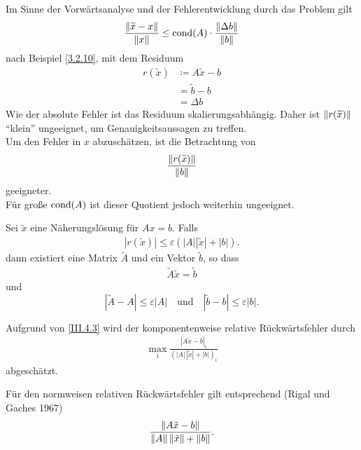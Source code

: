 Im Sinne der Vorwärtsanalyse und der Fehlerentwicklung durch das Problem gilt
\begin{gather*}
  \frac{\nn[\widetilde{x}-x]}{\nn[x]} 
  \leq \Cond(A) \cdot \frac{\nn[\Delta b]}{\nn[b]}
\end{gather*}
nach Beispiel \ref{3.2.10}, 
mit dem Residuum 
\begin{align}
  r(\widetilde{x})  
  & \coloneqq A\widetilde{x} - b \label{III.4.1} \\ \nonumber 
  &	= \widetilde{b}-b \\ \nonumber
  & = \Delta b
\end{align}
Wie der absolute Fehler ist das Residuum skalierungsabhängig.
Daher ist $\nn[r(\widetilde{x})]$ \enquote{klein} ungeeignet, um
Genauigkeitsaussagen zu treffen. \\
Um den Fehler in $x$ abzuschätzen, ist die Betrachtung von 
\begin{gather}
  \frac{\nn[r(\widetilde{x})]}{\nn[b]} \label{III.4.2}
\end{gather}
geeigneter. \\
Für große $\Cond(A)$ ist dieser Quotient jedoch weiterhin ungeeignet.

\begin{Satze}\label{3.4.1}
  Sei $\tilde{ x}$ eine Näherungslösung für 
  $  A  x =  b$. 
  Falls
  \begin{gather}\label{III.4.3}
    |  r(\tilde { x})| \leq \varepsilon ( | A| | \tilde { x} | + |  b|).
  \end{gather}
  dann existiert eine Matrix $\tilde{ A}$  und ein
  Vektor $\tilde { b}$, so dass
  \begin{gather*}
    \tilde{ A} \tilde { x}  =  \tilde{ b} 
  \end{gather*}
  und
  \begin{equation}
    |\tilde{ A} -  A |  \leq  \varepsilon | A|
    \quad \textrm{und} \quad | \tilde{ b} -  b| \leq
    \varepsilon | b|.
    \label{III.4.4}
  \end{equation}
  
  Aufgrund von \eqref{III.4.3} wird der komponentenweise relative
  Rückwärtsfehler durch 
  \begin{gather*}
    \max_i \frac{|  A \tilde{ x} -  b|_i}
    { (| A|\, |\tilde{ x}| + | b|)_i} 
  \end{gather*}
  abgeschätzt.
  
  Für den normweisen relativen Rückwärtsfehler gilt entsprechend
  (Rigal und Gaches 1967)
  \begin{gather*}
    \frac{\nn[A \tilde{x} -  b]}
    { \nn[A] \nn[\tilde{x}] + \nn[b] } .
  \end{gather*}
\end{Satze}

